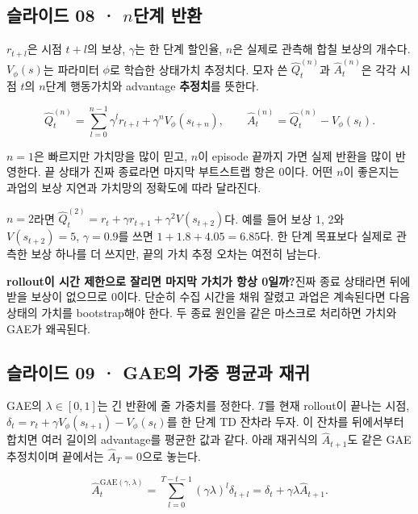 \documentclass[11pt,a4paper]{article}
\begin{document}
\subsection{슬라이드 08 · $n$단계 반환}

$r_{t+l}$은 시점 $t+l$의 보상, $\gamma$는 한 단계 할인율, $n$은 실제로 관측해 합칠 보상의 개수다. $V_\phi(s)$는 파라미터 $\phi$로 학습한 상태가치 추정치다. 모자 쓴 $\widehat Q_t^{(n)}$과 $\widehat A_t^{(n)}$은 각각 시점 $t$의 $n$단계 행동가치와 advantage \textbf{추정치}를 뜻한다.\par

\[
\widehat Q_t^{(n)}
=\sum_{l=0}^{n-1}\gamma^l r_{t+l}
+\gamma^n V_\phi(s_{t+n}),
\qquad
\widehat A_t^{(n)}=\widehat Q_t^{(n)}-V_\phi(s_t).
\]

$n=1$은 빠르지만 가치망을 많이 믿고, $n$이 episode 끝까지 가면 실제 반환을 많이 반영한다. 끝 상태가 진짜 종료라면 마지막 부트스트랩 항은 0이다. 어떤 $n$이 좋은지는 과업의 보상 지연과 가치망의 정확도에 따라 달라진다.\par

$n=2$라면 $\widehat Q_t^{(2)}=r_t+\gamma r_{t+1}+\gamma^2V(s_{t+2})$다. 예를 들어 보상 1, 2와 $V(s_{t+2})=5$, $\gamma=0.9$를 쓰면 $1+1.8+4.05=6.85$다. 한 단계 목표보다 실제로 관측한 보상 하나를 더 쓰지만, 끝의 가치 추정 오차는 여전히 남는다.\par

\par\medskip\noindent\textbf{rollout이 시간 제한으로 잘리면 마지막 가치가 항상 0일까?}\quad 진짜 종료 상태라면 뒤에 받을 보상이 없으므로 0이다. 단순히 수집 시간을 채워 잘렸고 과업은 계속된다면 다음 상태의 가치를 bootstrap해야 한다. 두 종료 원인을 같은 마스크로 처리하면 가치와 GAE가 왜곡된다.\par

\subsection{슬라이드 09 · GAE의 가중 평균과 재귀}

GAE의 $\lambda\in[0,1]$는 긴 반환에 줄 가중치를 정한다. $T$를 현재 rollout이 끝나는 시점, $\delta_t=r_t+\gamma V_\phi(s_{t+1})-V_\phi(s_t)$를 한 단계 TD 잔차라 두자. 이 잔차를 뒤에서부터 합치면 여러 길이의 advantage를 평균한 값과 같다. 아래 재귀식의 $\widehat A_{t+1}$도 같은 GAE 추정치이며 끝에서는 $\widehat A_T=0$으로 놓는다.\par

\[
\widehat A_t^{\mathrm{GAE}(\gamma,\lambda)}
=\sum_{l=0}^{T-t-1}(\gamma\lambda)^l\delta_{t+l}
=\delta_t+\gamma\lambda\widehat A_{t+1}.
\]
\end{document}
